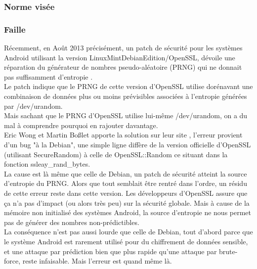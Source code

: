 		\subsubsection{Norme visée}
		\subsubsection{Faille}
		
			Récemment, en Août 2013 précisément, un patch de sécurité pour les 
			systèmes Android utilisant la version LinuxMintDebianEdition/OpenSSL, 
			dévoile une réparation du générateur de nombres pseudo-aléatoire (PRNG) 
			qui ne donnait pas suffisamment d'entropie
			\cite{alex2013android} \cite{bochum2013randomly}. \\
			
			Le patch indique que le PRNG de cette version d'OpenSSL utilise dorénavant 
			une combinaison de données plus ou moins prévisibles associées à 
			l'entropie générées par /dev/urandom. \\
			Mais sachant que le PRNG d'OpenSSL utilise lui-même /dev/urandom, on a du 
			mal à comprendre pourquoi en rajouter davantage.\\
		
			Eric Wong et Martin Boßlet apporte la solution sur leur site
			\cite{boblet2013android}, l'erreur 
			provient d'un bug "à la Debian", une simple ligne diffère de la version 
			officielle d'OpenSSL (utilisant SecureRandom) à celle de OpenSSL::Random 
			ce situant dans la fonction ssleay\_rand\_bytes. \\
		
			La cause est là même que celle de Debian, un patch de sécurité atteint la 
			source d'entropie du PRNG. Alors que tout semblait être rentré dans 
			l'ordre, un résidu de cette erreur reste dans cette version. Les 
			développeurs d'OpenSSL assure que ça n'a pas d'impact (ou alors très peu) 
			sur la sécurité globale. 
			Mais à cause de la mémoire non initialisé des systèmes Android, la source 
			d'entropie ne nous permet pas de générer des nombres non-prédictibles. \\
		
			La conséquence n'est pas aussi lourde que celle de Debian, tout d'abord 
			parce que le système Android est rarement utilisé pour du 
			chiffrement de données sensible, et une attaque par prédiction bien que
			plus rapide qu'une attaque par brute-force, reste infaisable. 
			Mais l'erreur est quand même là. \\
	
